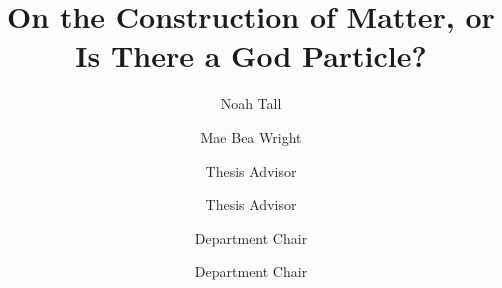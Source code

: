 \documentclass{scu-thesis}
\author{Noah Tall}
\author{Mae Bea Wright}
\title{On the Construction of Matter, or Is There a God Particle?}
\begin{document}
\frontmatter
\signature{Thesis Advisor}
\signature{Thesis Advisor}
\signature{Department Chair}
\signature{Department Chair}

\maketitle


\tableofcontents
\listoffigures

\mainmatter





\backmatter
\end{document}
